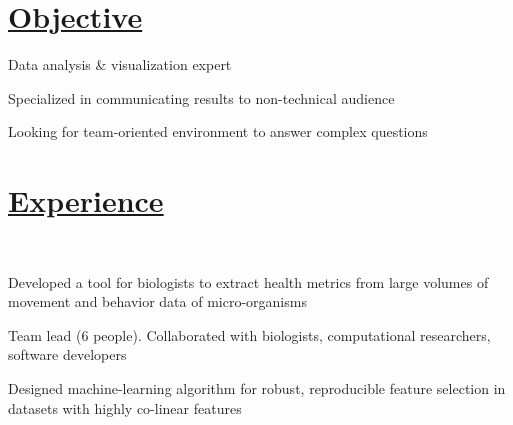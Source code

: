\documentclass[]{winter-resume-openfont}
\begin{document}
\begin{minipage}[t]{0.65\textwidth}


\section{\underline{Objective}}
\vspace{\topsep} %
\begin{tightemize}
\item Data analysis \& visualization expert 
\item Specialized in communicating results to non-technical audience
\item Looking for team-oriented environment to answer complex questions
\end{tightemize}

\sectionsep

\section{\underline{Experience}}

\sectionsep

 \\

\sectionsep


\begin{tightemize}
\item Developed a tool for biologists to extract health metrics from large
volumes of movement and behavior data of micro-organisms
\item Team lead (6 people).  Collaborated with biologists, computational researchers, software developers
\item Designed machine-learning algorithm for robust, reproducible feature selection in datasets with highly co-linear features
\end{tightemize}

\sectionsep


\end{minipage}
\end{document}
